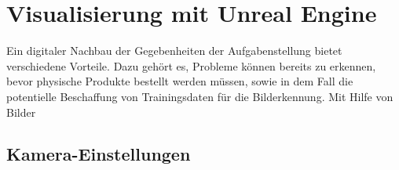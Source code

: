 \newpage
\section{Visualisierung mit Unreal Engine}
Ein digitaler Nachbau der Gegebenheiten der Aufgabenstellung bietet verschiedene Vorteile. Dazu gehört es, Probleme können bereits zu erkennen, bevor physische Produkte bestellt werden müssen, sowie in dem Fall die potentielle Beschaffung von Trainingsdaten für die Bilderkennung. Mit Hilfe von Bilder  
\subsection{Kamera-Einstellungen}

